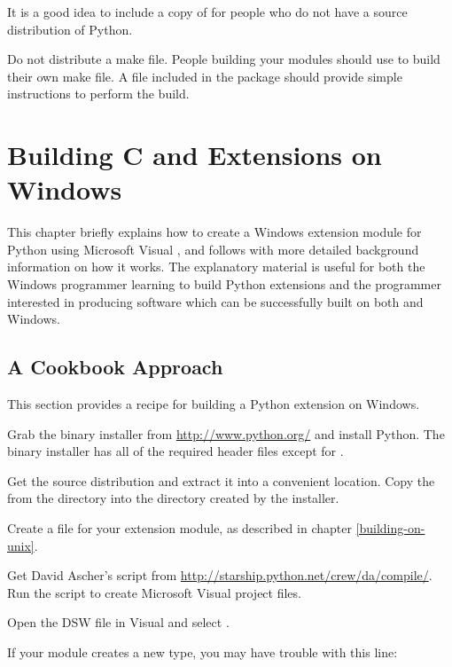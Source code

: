 \documentclass{manual}
\begin{document}
It is a good idea to include a copy of  for
people who do not have a source distribution of Python.

Do not distribute a make file.  People building your modules
should use  to build their own make file.  A
 file included in the package should provide simple
instructions to perform the build.


\chapter{Building C and \Cpp{} Extensions on Windows
         \label{building-on-windows}}


This chapter briefly explains how to create a Windows extension module
for Python using Microsoft Visual \Cpp{}, and follows with more
detailed background information on how it works.  The explanatory
material is useful for both the Windows programmer learning to build
Python extensions and the \UNIX{} programmer interested in producing
software which can be successfully built on both \UNIX{} and Windows.


\section{A Cookbook Approach \label{win-cookbook}}


This section provides a recipe for building a Python extension on
Windows.

Grab the binary installer from \url{http://www.python.org/} and
install Python.  The binary installer has all of the required header
files except for .

Get the source distribution and extract it into a convenient location.
Copy the  from the  directory into the
 directory created by the installer.

Create a  file for your extension module, as described in
chapter \ref{building-on-unix}.

Get David Ascher's  script from
\url{http://starship.python.net/crew/da/compile/}.  Run the script to
create Microsoft Visual \Cpp{} project files.

Open the DSW file in Visual \Cpp{} and select .

If your module creates a new type, you may have trouble with this line:
\end{document}
